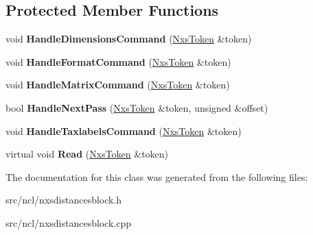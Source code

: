 \subsection*{Protected Member Functions}
\begin{DoxyCompactItemize}
\item 
\hypertarget{classNxsDistancesBlock_a2515878c3059a7289fddb1333bf3ab3a}{
void {\bfseries HandleDimensionsCommand} (\hyperlink{classNxsToken}{NxsToken} \&token)}
\label{classNxsDistancesBlock_a2515878c3059a7289fddb1333bf3ab3a}

\item 
\hypertarget{classNxsDistancesBlock_a935db45ad89e52f0b4b78f6b86c3d594}{
void {\bfseries HandleFormatCommand} (\hyperlink{classNxsToken}{NxsToken} \&token)}
\label{classNxsDistancesBlock_a935db45ad89e52f0b4b78f6b86c3d594}

\item 
\hypertarget{classNxsDistancesBlock_a34437a6e19eed81bfc1d1d5b6b7483d1}{
void {\bfseries HandleMatrixCommand} (\hyperlink{classNxsToken}{NxsToken} \&token)}
\label{classNxsDistancesBlock_a34437a6e19eed81bfc1d1d5b6b7483d1}

\item 
\hypertarget{classNxsDistancesBlock_a734b53f5d2d9ff8d406fb3d330972260}{
bool {\bfseries HandleNextPass} (\hyperlink{classNxsToken}{NxsToken} \&token, unsigned \&offset)}
\label{classNxsDistancesBlock_a734b53f5d2d9ff8d406fb3d330972260}

\item 
\hypertarget{classNxsDistancesBlock_ae23b77f2d2777f6728fa75e2d6bdc525}{
void {\bfseries HandleTaxlabelsCommand} (\hyperlink{classNxsToken}{NxsToken} \&token)}
\label{classNxsDistancesBlock_ae23b77f2d2777f6728fa75e2d6bdc525}

\item 
\hypertarget{classNxsDistancesBlock_ae1ba118f39196c10f788832f5abab6be}{
virtual void {\bfseries Read} (\hyperlink{classNxsToken}{NxsToken} \&token)}
\label{classNxsDistancesBlock_ae1ba118f39196c10f788832f5abab6be}

\end{DoxyCompactItemize}


The documentation for this class was generated from the following files:\begin{DoxyCompactItemize}
\item 
src/ncl/nxsdistancesblock.h\item 
src/ncl/nxsdistancesblock.cpp\end{DoxyCompactItemize}
